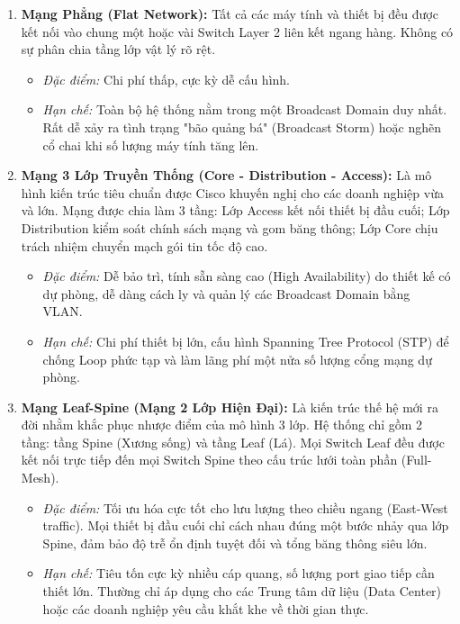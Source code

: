 \begin{enumerate}
    \item \textbf{Mạng Phẳng (Flat Network):}
    Tất cả các máy tính và thiết bị đều được kết nối vào chung một hoặc vài Switch Layer 2 liên kết ngang hàng. Không có sự phân chia tầng lớp vật lý rõ rệt.
    \begin{itemize}
        \item \textit{Đặc điểm:} Chi phí thấp, cực kỳ dễ cấu hình.
        \item \textit{Hạn chế:} Toàn bộ hệ thống nằm trong một Broadcast Domain duy nhất. Rất dễ xảy ra tình trạng "bão quảng bá" (Broadcast Storm) hoặc nghẽn cổ chai khi số lượng máy tính tăng lên.
    \end{itemize}
    
    \item \textbf{Mạng 3 Lớp Truyền Thống (Core - Distribution - Access):}
    Là mô hình kiến trúc tiêu chuẩn được Cisco khuyến nghị cho các doanh nghiệp vừa và lớn. Mạng được chia làm 3 tầng: Lớp Access kết nối thiết bị đầu cuối; Lớp Distribution kiểm soát chính sách mạng và gom băng thông; Lớp Core chịu trách nhiệm chuyển mạch gói tin tốc độ cao.
    \begin{itemize}
        \item \textit{Đặc điểm:} Dễ bảo trì, tính sẵn sàng cao (High Availability) do thiết kế có dự phòng, dễ dàng cách ly và quản lý các Broadcast Domain bằng VLAN.
        \item \textit{Hạn chế:} Chi phí thiết bị lớn, cấu hình Spanning Tree Protocol (STP) để chống Loop phức tạp và làm lãng phí một nửa số lượng cổng mạng dự phòng.
    \end{itemize}

    \item \textbf{Mạng Leaf-Spine (Mạng 2 Lớp Hiện Đại):}
    Là kiến trúc thế hệ mới ra đời nhằm khắc phục nhược điểm của mô hình 3 lớp. Hệ thống chỉ gồm 2 tầng: tầng Spine (Xương sống) và tầng Leaf (Lá). Mọi Switch Leaf đều được kết nối trực tiếp đến mọi Switch Spine theo cấu trúc lưới toàn phần (Full-Mesh).
    \begin{itemize}
        \item \textit{Đặc điểm:} Tối ưu hóa cực tốt cho lưu lượng theo chiều ngang (East-West traffic). Mọi thiết bị đầu cuối chỉ cách nhau đúng một bước nhảy qua lớp Spine, đảm bảo độ trễ ổn định tuyệt đối và tổng băng thông siêu lớn.
        \item \textit{Hạn chế:} Tiêu tốn cực kỳ nhiều cáp quang, số lượng port giao tiếp cần thiết lớn. Thường chỉ áp dụng cho các Trung tâm dữ liệu (Data Center) hoặc các doanh nghiệp yêu cầu khắt khe về thời gian thực.
    \end{itemize}
\end{enumerate}




